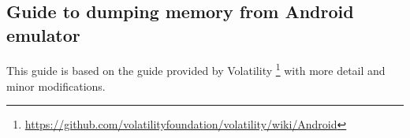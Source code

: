 \newcommand*\justify{%
  \fontdimen2\font=0.4em%
  \fontdimen3\font=0.2em%
  \fontdimen4\font=0.1em%
  \fontdimen7\font=0.1em%
  \hyphenchar\font=`\-%
}

        \section{}
\subsection{Guide to dumping memory from Android emulator}\label{guide}
  This guide is based on the guide provided by Volatility \footnote{\url{https://github.com/volatilityfoundation/volatility/wiki/Android}} 
  with more detail and minor modifications.\\
  
